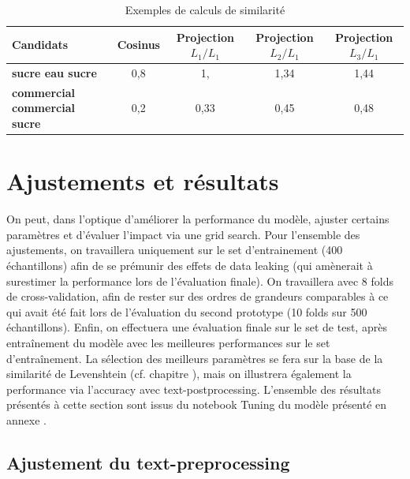             \begin{table}[hbtp]
            \begin{center}
            \begin{small}
            \begin{tabular}{lcccc}
                \toprule
                \textbf{Candidats} &  \textbf{Cosinus} &  \textbf{Projection $L_{1}/L_{1}$} & \textbf{Projection $L_{2}/L_{1}$} & \textbf{Projection $L_{3}/L_{1}$}\\
                \midrule
                \textbf{sucre eau sucre} &  0,8 & 1, & 1,34 & 1,44 \\
                \textbf{commercial commercial sucre} & 0,2 & 0,33 & 0,45 & 0,48 \\
                \bottomrule
            \end{tabular}
            \end{small}
            \caption{Exemples de calculs de similarité}
            \label{tbl:similarites_exemples}
            \end{center}
            \end{table}

    \section{Ajustements et résultats}
            
    On peut, dans l'optique d'améliorer la performance du modèle, ajuster certains paramètres et d'évaluer l'impact via une grid search.
    Pour l'ensemble des ajustements, on travaillera uniquement sur le set d'entrainement (400 échantillons) afin de se prémunir des effets de data leaking (qui amènerait à surestimer la performance lors de l'évaluation finale).
    On travaillera avec 8 folds de cross-validation, afin de rester sur des ordres de grandeurs comparables à ce qui avait été fait lors de l'évaluation du second prototype (10 folds sur 500 échantillons).
    Enfin, on effectuera une évaluation finale sur le set de test, après entraînement du modèle avec les meilleures performances sur le set d'entraînement.
    La sélection des meilleurs paramètres se fera sur la base de la similarité de Levenshtein (cf. chapitre ), mais on illustrera également la performance via l'accuracy avec text-postprocessing.
    L'ensemble des résultats présentés à cette section sont issus du notebook \og Tuning du modèle \fg présenté en annexe .

        \subsection{Ajustement du text-preprocessing}

